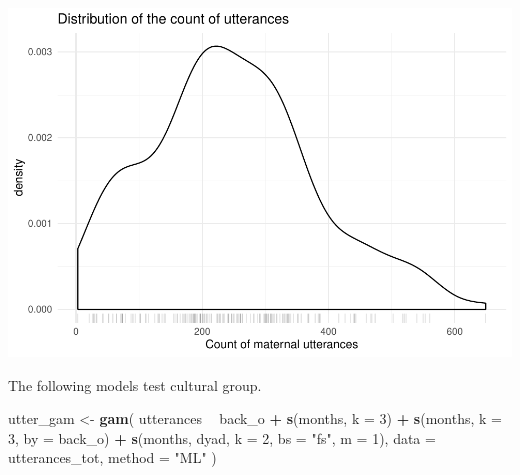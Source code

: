 \documentclass[]{article}
\newenvironment{Shaded}{\begin{snugshade}}{\end{snugshade}}
\newcommand{\DataTypeTok}[1]{\textcolor[rgb]{0.13,0.29,0.53}{#1}}
\newcommand{\DecValTok}[1]{\textcolor[rgb]{0.00,0.00,0.81}{#1}}
\newcommand{\FloatTok}[1]{\textcolor[rgb]{0.00,0.00,0.81}{#1}}
\newcommand{\KeywordTok}[1]{\textcolor[rgb]{0.13,0.29,0.53}{\textbf{#1}}}
\newcommand{\NormalTok}[1]{#1}
\newcommand{\OperatorTok}[1]{\textcolor[rgb]{0.81,0.36,0.00}{\textbf{#1}}}
\newcommand{\StringTok}[1]{\textcolor[rgb]{0.31,0.60,0.02}{#1}}
\begin{document}
\begin{Shaded}
\end{Shaded}

\includegraphics{supplement_files/figure-latex/utterances-1.pdf}

The following models test cultural group.

\begin{Shaded}
\begin{Highlighting}[]
\NormalTok{utter_gam <-}\StringTok{ }\KeywordTok{gam}\NormalTok{(}
\NormalTok{  utterances }\OperatorTok{~}
\StringTok{    }\NormalTok{back_o }\OperatorTok{+}
\StringTok{    }\KeywordTok{s}\NormalTok{(months, }\DataTypeTok{k =} \DecValTok{3}\NormalTok{) }\OperatorTok{+}
\StringTok{    }\KeywordTok{s}\NormalTok{(months, }\DataTypeTok{k =} \DecValTok{3}\NormalTok{, }\DataTypeTok{by =}\NormalTok{ back_o) }\OperatorTok{+}
\StringTok{    }\KeywordTok{s}\NormalTok{(months, dyad, }\DataTypeTok{k =} \DecValTok{2}\NormalTok{, }\DataTypeTok{bs =} \StringTok{"fs"}\NormalTok{, }\DataTypeTok{m =} \DecValTok{1}\NormalTok{),}
  \DataTypeTok{data =}\NormalTok{ utterances_tot,}
  \DataTypeTok{method =} \StringTok{"ML"}
\NormalTok{)}
\end{Highlighting}
\end{Shaded}
\end{document}
